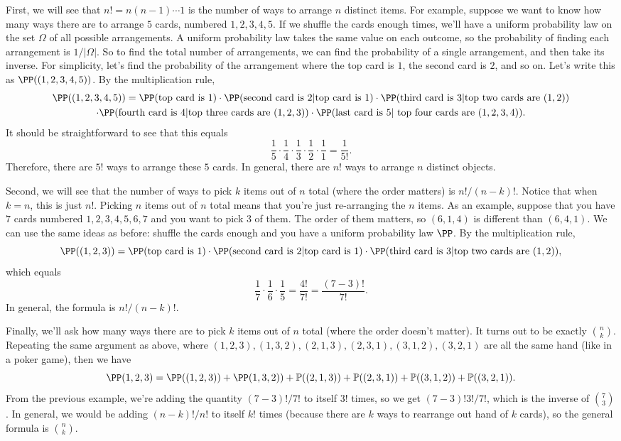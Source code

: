 \documentclass{ximera}
\begin{document}
First, we will see that $n!=n(n-1)\cdots 1$ is the number of ways to arrange $n$ distinct items. For example, suppose we want to know how many ways there are to arrange $5$ cards, numbered $1,2,3,4,5$. If we shuffle the cards enough times, we'll have a uniform probability law on the set $\Omega$ of all possible arrangements. A uniform probability law takes the same value on each outcome, so the probability of finding each arrangement is $1/\vert \Omega\vert$. So to find the total number of arrangements, we can find the probability of a single arrangement, and then take its inverse. For simplicity, let's find the probability of the arrangement where the top card is $1$, the second card is $2$, and so on. Let's write this as $\PP( (1,2,3,4,5))$. By the multiplication rule, 
\begin{multline*}
\PP((1,2,3,4,5)) = \PP(\text{top card is 1}) \cdot \PP(\text{second card is 2} \vert \text{top card is 1}) \cdot \PP(\text{third card is 3} \vert \text{top two cards are }(1,2)) \\
\cdot \PP(\text{fourth card is 4} \vert \text{top three cards are } (1,2,3)) \cdot \PP(\text{last card is 5} \vert \text{ top four cards are } (1,2,3,4)).
\end{multline*}
It should be straightforward to see that this equals
$$
\frac{1}{5} \cdot \frac{1}{4} \cdot \frac{1}{3} \cdot \frac{1}{2} \cdot \frac{1}{1} = \frac{1}{5!}.
$$
Therefore, there are $5!$ ways to arrange these $5$ cards. In general, there are $n!$ ways to arrange $n$ distinct objects. 

Second, we will see that the number of ways to pick $k$ items out of $n$ total (where the order matters) is $n!/(n-k)!$. Notice that when $k=n$, this is just $n!$. Picking $n$ items out of $n$ total means that you're just re-arranging the $n$ items. As an example, suppose that you have $7$ cards numbered $1,2,3,4,5,6,7$ and you want to pick $3$ of them. The order of them matters, so $(6,1,4)$ is different than $(6,4,1)$. We can use the same ideas as before: shuffle the cards enough and you have a uniform probability law $\PP$. By the multiplication rule,
$$
\PP((1,2,3)) = \PP(\text{top card is 1}) \cdot \PP(\text{second card is 2} \vert \text{top card is 1}) \cdot \PP(\text{third card is 3} \vert \text{top two cards are }(1,2)),
$$
which equals 
$$
\frac{1}{7} \cdot \frac{1}{6} \cdot \frac{1}{5} = \frac{4!}{7!} = \frac{(7-3)!}{7!}.
$$
In general, the formula is $n!/(n-k)!$.

Finally, we'll ask how many ways there are to pick $k$ items out of $n$ total (where the order doesn't matter). It turns out to be exactly $\binom{n}{k}$. Repeating the same argument as above, where $(1,2,3),(1,3,2),(2,1,3),(2,3,1),(3,1,2),(3,2,1)$ are all the same hand (like in a poker game), then we have
$$
\PP({1,2,3}) = \PP((1,2,3))+\PP(1,3,2))+\mathbb{P}((2,1,3))+\mathbb{P}((2,3,1))+\mathbb{P}((3,1,2))+\mathbb{P}((3,2,1)).
$$
From the previous example, we're adding the quantity $(7-3)!/7!$ to itself $3!$ times, so we get $(7-3)!3!/7!$, which is the inverse of $\binom{7}{3}$. In general, we would be adding $(n-k)!/n!$ to itself $k!$ times (because there are $k$ ways to rearrange out hand of $k$ cards), so the general formula is $\binom{n}{k}$.
\end{document}
